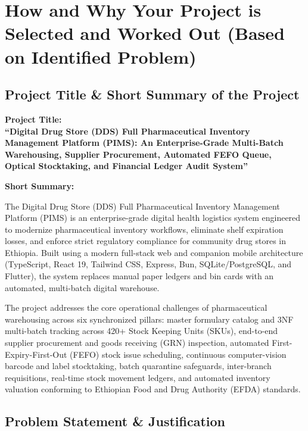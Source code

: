 \chapter{How and Why Your Project is Selected and Worked Out (Based on Identified Problem)}
\label{chap:project_ddss}

\section{Project Title \& Short Summary of the Project}
\begin{center}
\textbf{\large Project Title:} \\[0.2cm]
{\Large\bfseries “Digital Drug Store (DDS) Full Pharmaceutical Inventory Management Platform (PIMS): An Enterprise-Grade Multi-Batch Warehousing, Supplier Procurement, Automated FEFO Queue, Optical Stocktaking, and Financial Ledger Audit System”}
\end{center}
\vspace{0.3cm}

\noindent\textbf{Short Summary:}\par
The Digital Drug Store (DDS) Full Pharmaceutical Inventory Management Platform (PIMS) is an enterprise-grade digital health logistics system engineered to modernize pharmaceutical inventory workflows, eliminate shelf expiration losses, and enforce strict regulatory compliance for community drug stores in Ethiopia. Built using a modern full-stack web and companion mobile architecture (TypeScript, React 19, Tailwind CSS, Express, Bun, SQLite/PostgreSQL, and Flutter), the system replaces manual paper ledgers and bin cards with an automated, multi-batch digital warehouse.

The project addresses the core operational challenges of pharmaceutical warehousing across six synchronized pillars: master formulary catalog and 3NF multi-batch tracking across 420+ Stock Keeping Units (SKUs), end-to-end supplier procurement and goods receiving (GRN) inspection, automated First-Expiry-First-Out (FEFO) stock issue scheduling, continuous computer-vision barcode and label stocktaking, batch quarantine safeguards, inter-branch requisitions, real-time stock movement ledgers, and automated inventory valuation conforming to Ethiopian Food and Drug Authority (EFDA) standards.

\section{Problem Statement \& Justification}

